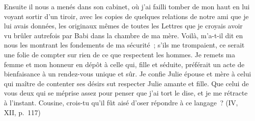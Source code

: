\documentclass[11pt,twoside,openany]{book}
\newenvironment{lateiDocument}{}{}
\begin{document}
\begin{lateiDocument}
\begin{teiElement}[name={TEI},change={commons\_edition}]
\begin{teiElement}[name={text},type={book},xmlid={book}]
\begin{teiElement}[name={group},type={book},xmlid={book-001}]
\begin{teiElement}[name={group},type={section1},xmlid={section1-001}]
\begin{teiElement}
\begin{teiElement}[name={body},xmlid={body-002}]
\begin{teiDiv}[type={section1},xmlid={div01}]
              \begin{teiCit}[xmlid={cit01-2}]

                \begin{teiQuote}
Ensuite il nous a menés dans son cabinet, où j’ai failli tomber de mon haut en lui voyant sortir d’un tiroir, avec les copies de quelques relations de notre ami que je lui avais données, les originaux mêmes de toutes les Lettres que je croyais avoir vu brûler autrefois par Babi dans la chambre de ma mère. Voilà, m’a-t-il dit en nous les montrant les fondements de ma sécurité ; s’ils me trompaient, ce serait une folie de compter sur rien de ce que respectent les hommes. Je remets ma femme et mon honneur en dépôt à celle qui, fille et séduite, préférait un acte de bienfaisance à un rendez-vous unique et sûr. Je confie Julie épouse et mère à celui qui maître de contenter ses désirs sut respecter Julie amante et fille. Que celui de vous deux qui se méprise assez pour penser que j’ai tort le dise, et je me rétracte à l’instant. Cousine, crois-tu qu’il fût aisé d’oser répondre à ce langage ? (IV, XII, p. 117)
\end{teiQuote}
              

\end{teiCit}
\end{teiDiv}
\end{teiElement}
\end{teiElement}
\end{teiElement}
\end{teiElement}
\end{teiElement}
\end{teiElement}
\end{lateiDocument}
\end{document}
